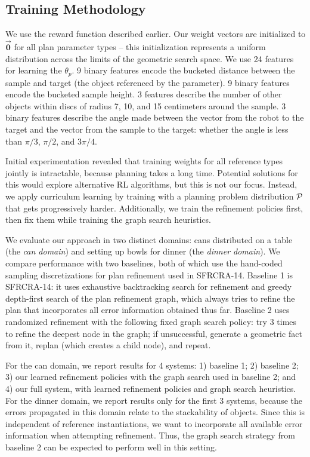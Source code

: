 \subsection{Training Methodology}
We use the reward function described earlier. Our weight
vectors are initialized to $\vec{\mathbf{0}}$ for all plan parameter types -- this
initialization represents a uniform distribution across the limits of the geometric search space.
We use 24 features for learning the $\theta_{p}$. 9 binary features encode the bucketed distance between the sample
and target (the object referenced by the parameter). 9 binary features encode the bucketed sample height. 3 features
describe the number of other objects within discs of radius 7, 10, and 15 centimeters around the
sample. 3 binary features describe the angle made between the vector from the
robot to the target and the vector from the sample to the target: whether the angle is less than
$\pi/3$, $\pi/2$, and $3\pi/4$.

Initial experimentation revealed that training weights for all reference types jointly is intractable,
because planning takes a long time. Potential solutions for this would explore alternative RL algorithms,
but this is not our focus. Instead, we apply curriculum learning by training with a planning problem distribution
$\mathcal{P}$ that gets progressively harder. Additionally, we train the refinement policies first, then fix them while
training the graph search heuristics.

We evaluate our approach in two distinct domains: cans distributed on a table (the \emph{can domain})
and setting up bowls for dinner (the \emph{dinner domain}).
We compare performance with two baselines, both of which use the hand-coded sampling discretizations for
plan refinement used in SFRCRA-14. Baseline 1 is SFRCRA-14: it uses exhaustive backtracking search for refinement
and greedy depth-first search of the plan refinement graph, which always tries to refine
the plan that incorporates all error information obtained thus far.
Baseline 2 uses randomized refinement with the following fixed graph search policy: try 3 times to refine the deepest
node in the graph; if unsuccessful, generate a geometric fact from it, replan (which creates a child node), and repeat.

For the can domain, we report results for 4 systems: 1) baseline 1; 2) baseline 2; 3) our learned refinement policies
with the graph search used in baseline 2; and 4) our full system, with learned refinement policies and graph search heuristics.
For the dinner domain, we report results only for the first 3 systems, because the errors propagated in this
domain relate to the stackability of objects. Since this is independent of reference instantiations, we want to
incorporate all available error information when attempting refinement. Thus, the graph search strategy
from baseline 2 can be expected to perform well in this setting.

